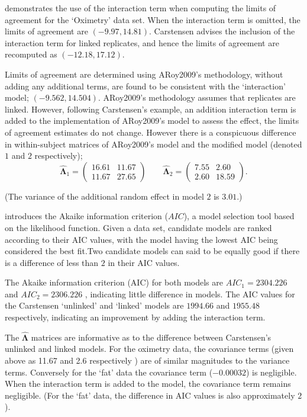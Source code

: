 \documentclass[12pt, a4paper]{report}
\theoremstyle{plain}
\theoremstyle{definition}
\theoremstyle{remark}
\begin{document}
	
	\citet{BXC2008} demonstrates the use of the interaction term when computing the limits of agreement for the `Oximetry' data set. When the interaction term is omitted, the limits of agreement are $(-9.97, 14.81)$. Carstensen advises the inclusion of the interaction term for linked replicates, and hence the limits of agreement are recomputed as $(-12.18,17.12)$.
	
	
	Limits of agreement are determined using ARoy2009's methodology, without adding any additional terms, are found to be consistent with the `interaction' model; $(-9.562, 14.504 )$. ARoy2009's methodology assumes that replicates are linked. However, following Carstensen's example, an addition interaction term is added to the implementation of ARoy2009's model to assess the effect, the limits of agreement estimates do not change. However there is a conspicuous difference in within-subject matrices of ARoy2009's model and the modified model (denoted $1$ and $2$ respectively);
	\begin{equation}
	\hat{\boldsymbol{\Lambda}}_{1}= \left(\begin{array}{cc}
	16.61 &	11.67\\
	11.67 & 27.65 \end{array}\right) \qquad
	\boldsymbol{\hat{\Lambda}}_{2}= \left( \begin{array}{cc}
	7.55 & 2.60 \\
	2.60 & 18.59 \end{array} \right).
	\end{equation}
	
	\noindent (The variance of the additional random effect in model $2$ is $3.01$.)
	
	\citet{akaike} introduces the Akaike information criterion ($AIC$), a model
	selection tool based on the likelihood function. Given a data set, candidate models
	are ranked according to their AIC values, with the model having the lowest AIC being considered the best fit.Two candidate models can said to be equally good if there is a difference of less than $2$ in their AIC values.
	
	The Akaike information criterion (AIC) for both models are $AIC_{1} = 2304.226$ and $AIC_{2} = 2306.226$ , indicating little difference in models. The AIC values for the Carstensen `unlinked' and `linked' models are $1994.66$ and $1955.48$ respectively, indicating an improvement by adding the interaction term.
	
	The $\boldsymbol{\hat{\Lambda}}$ matrices are informative as to the difference between Carstensen's unlinked and linked models. For the oximetry data, the covariance terms (given above as 11.67 and 2.6 respectively ) are of similar magnitudes to the variance terms. Conversely for the `fat' data the covariance term ($-0.00032$) is negligible. When the interaction term is added to the model, the covariance term remains negligible. (For the `fat' data, the difference in AIC values is also approximately $2$).
	
\end{document}
